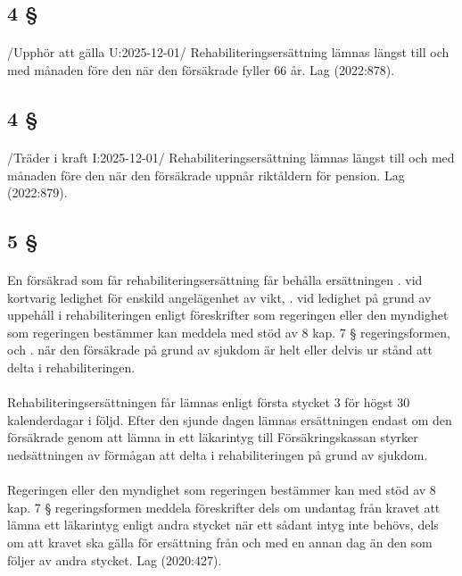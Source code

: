 \documentclass[a4paper,notitlepage,openany,10pt]{book}
\begin{document}
\subsection*{4 §}
\paragraph*{}
/Upphör att gälla U:2025-12-01/
Rehabiliteringsersättning lämnas längst till och med månaden före den när den försäkrade fyller 66 år.
Lag (2022:878).
\subsection*{4 §}
\paragraph*{}
/Träder i kraft I:2025-12-01/
Rehabiliteringsersättning lämnas längst till och med månaden före den när den försäkrade uppnår riktåldern för pension.
Lag (2022:879).
\subsection*{5 §}
\paragraph*{}
En försäkrad som får rehabiliteringsersättning får behålla ersättningen
. vid kortvarig ledighet för enskild angelägenhet av vikt,
. vid ledighet på grund av uppehåll i rehabiliteringen enligt föreskrifter som regeringen eller den myndighet som regeringen bestämmer kan meddela med stöd av 8 kap. 7 § regeringsformen, och
. när den försäkrade på grund av sjukdom är helt eller delvis ur stånd att delta i rehabiliteringen.
\paragraph*{}
Rehabiliteringsersättningen får lämnas enligt första stycket 3 för högst 30 kalenderdagar i följd. Efter den sjunde dagen lämnas ersättningen endast om den försäkrade genom att lämna in ett läkarintyg till Försäkringskassan styrker nedsättningen av förmågan att delta i rehabiliteringen på grund av sjukdom.
\paragraph*{}
Regeringen eller den myndighet som regeringen bestämmer kan med stöd av 8 kap. 7 § regeringsformen meddela föreskrifter dels om undantag från kravet att lämna ett läkarintyg enligt andra stycket när ett sådant intyg inte behövs, dels om att kravet ska gälla för ersättning från och med en annan dag än den som följer av andra stycket.
Lag (2020:427).
\end{document}
